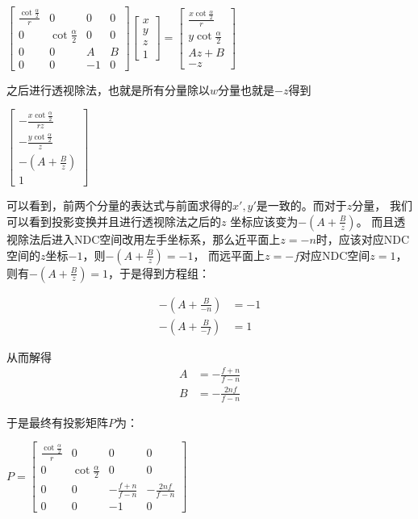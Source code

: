 \documentclass[UTF8]{ctexart}
\begin{document}
$\begin{bmatrix} \frac{\cot\frac{\alpha}{2}}{r} & 0 & 0 & 0 \\
    0 & \cot\frac{\alpha}{2} & 0 & 0 \\
    0 & 0 & A & B \\
    0 & 0 & -1 & 0 
\end {bmatrix} \begin{bmatrix} x \\ y \\ z \\ 1 \end{bmatrix} 
= \begin{bmatrix} \frac{x\cot\frac{\alpha}{2}}{r} \\ {y\cot\frac{\alpha}{2}} \\ Az+B \\ -z\end{bmatrix}
$

之后进行透视除法，也就是所有分量除以$w$分量也就是$-z$得到
\vspace{1em}


$ \begin{bmatrix} -\frac{x\cot\frac{\alpha}{2}}{rz} \\ -\frac{y\cot\frac{\alpha}{2}}{z} \\ -(A+\frac{B}{z}) \\ 1\end{bmatrix} $

可以看到，前两个分量的表达式与前面求得的$x',y'$是一致的。而对于$z$分量，
我们可以看到投影变换并且进行透视除法之后的$z$
坐标应该变为$-(A+\frac{B}{z})$。
而且透视除法后进入NDC空间改用左手坐标系，那么近平面上$z = -n$时，应该对应NDC空间的$z$坐标$-1$，则$-(A+\frac{B}{z}) = -1$，
而远平面上$z = -f$对应NDC空间$z=1$，则有$-(A+\frac{B}{z}) = 1$，于是得到方程组：

\begin{align}
-(A+\frac{B}{-n}) &= -1 \\
-(A+\frac{B}{-f}) &= 1 
\end{align}

从而解得
\begin{align}
A &= -\frac{f+n}{f-n}\\
B &= -\frac{2nf}{f-n} 
\end{align}

\newpage

于是最终有投影矩阵$P$为：

\vspace{1em}

$ P = \begin{bmatrix} \frac{\cot\frac{\alpha}{2}}{r} & 0 & 0 & 0 \\
    0 & \cot\frac{\alpha}{2} & 0 & 0 \\
    0 & 0 & -\frac{f+n}{f-n} & -\frac{2nf}{f-n}  \\
    0 & 0 & -1 & 0 
\end {bmatrix}$
\end{document}
